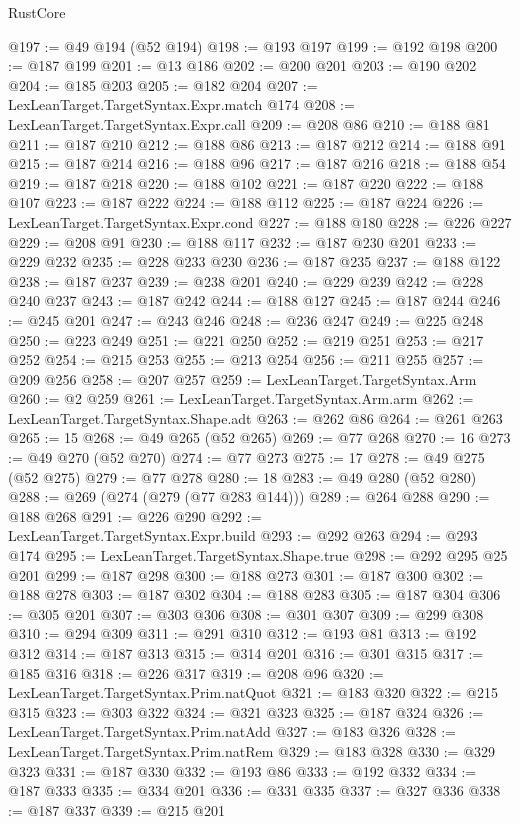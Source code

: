 \begin{lexlean}{RustCore}
\begin{coremodule}
@197 := @49 @194 (@52 @194)
@198 := @193 @197
@199 := @192 @198
@200 := @187 @199
@201 := @13 @186
@202 := @200 @201
@203 := @190 @202
@204 := @185 @203
@205 := @182 @204
@207 := LexLeanTarget.TargetSyntax.Expr.match @174
@208 := LexLeanTarget.TargetSyntax.Expr.call
@209 := @208 @86
@210 := @188 @81
@211 := @187 @210
@212 := @188 @86
@213 := @187 @212
@214 := @188 @91
@215 := @187 @214
@216 := @188 @96
@217 := @187 @216
@218 := @188 @54
@219 := @187 @218
@220 := @188 @102
@221 := @187 @220
@222 := @188 @107
@223 := @187 @222
@224 := @188 @112
@225 := @187 @224
@226 := LexLeanTarget.TargetSyntax.Expr.cond
@227 := @188 @180
@228 := @226 @227
@229 := @208 @91
@230 := @188 @117
@232 := @187 @230 @201
@233 := @229 @232
@235 := @228 @233 @230
@236 := @187 @235
@237 := @188 @122
@238 := @187 @237
@239 := @238 @201
@240 := @229 @239
@242 := @228 @240 @237
@243 := @187 @242
@244 := @188 @127
@245 := @187 @244
@246 := @245 @201
@247 := @243 @246
@248 := @236 @247
@249 := @225 @248
@250 := @223 @249
@251 := @221 @250
@252 := @219 @251
@253 := @217 @252
@254 := @215 @253
@255 := @213 @254
@256 := @211 @255
@257 := @209 @256
@258 := @207 @257
@259 := LexLeanTarget.TargetSyntax.Arm
@260 := @2 @259
@261 := LexLeanTarget.TargetSyntax.Arm.arm
@262 := LexLeanTarget.TargetSyntax.Shape.adt
@263 := @262 @86
@264 := @261 @263
@265 := 15
@268 := @49 @265 (@52 @265)
@269 := @77 @268
@270 := 16
@273 := @49 @270 (@52 @270)
@274 := @77 @273
@275 := 17
@278 := @49 @275 (@52 @275)
@279 := @77 @278
@280 := 18
@283 := @49 @280 (@52 @280)
@288 := @269 (@274 (@279 (@77 @283 @144)))
@289 := @264 @288
@290 := @188 @268
@291 := @226 @290
@292 := LexLeanTarget.TargetSyntax.Expr.build
@293 := @292 @263
@294 := @293 @174
@295 := LexLeanTarget.TargetSyntax.Shape.true
@298 := @292 @295 @25 @201
@299 := @187 @298
@300 := @188 @273
@301 := @187 @300
@302 := @188 @278
@303 := @187 @302
@304 := @188 @283
@305 := @187 @304
@306 := @305 @201
@307 := @303 @306
@308 := @301 @307
@309 := @299 @308
@310 := @294 @309
@311 := @291 @310
@312 := @193 @81
@313 := @192 @312
@314 := @187 @313
@315 := @314 @201
@316 := @301 @315
@317 := @185 @316
@318 := @226 @317
@319 := @208 @96
@320 := LexLeanTarget.TargetSyntax.Prim.natQuot
@321 := @183 @320
@322 := @215 @315
@323 := @303 @322
@324 := @321 @323
@325 := @187 @324
@326 := LexLeanTarget.TargetSyntax.Prim.natAdd
@327 := @183 @326
@328 := LexLeanTarget.TargetSyntax.Prim.natRem
@329 := @183 @328
@330 := @329 @323
@331 := @187 @330
@332 := @193 @86
@333 := @192 @332
@334 := @187 @333
@335 := @334 @201
@336 := @331 @335
@337 := @327 @336
@338 := @187 @337
@339 := @215 @201

\end{coremodule}
\end{lexlean}
